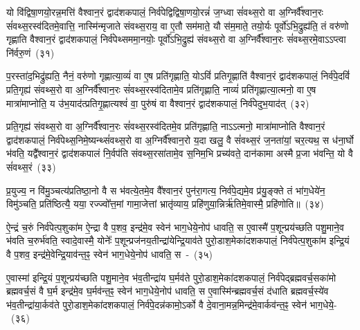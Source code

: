 यो वि॑द्विषा॒णयो॒रन्न॒मत्ति॑ वैश्वान॒रं द्वाद॑श\-कपालं॒ निर्व॑पेद्विद्विषा॒\-णयो॒रन्नं॑ ज॒ग्ध्वा सं॑वथ्स॒रो वा अ॒ग्निर्वै᳚श्वान॒रः सं॑वथ्स॒रस्व॑दितमे॒वात्ति॒ नास्मि॑न्मृजाते संवथ्स॒राय॒ वा ए॒तौ सम॑माते॒ यौ स॑म॒माते॒ तयो॒र्यः पूर्वो॑\-ऽभि॒द्रुह्य॑ति॒ तं वरु॑णो गृह्णाति वैश्वान॒रं द्वाद॑श\-कपालं॒ निर्व॑पेथ्सममा॒नयोः॒ पूर्वो॑\-ऽभि॒द्रुह्य॑ संवथ्स॒रो वा अ॒ग्निर्वै᳚श्वान॒रः सं॑वथ्स॒रमे॒वा\-ऽऽ\-प्त्वा नि॑र्वरु॒णं~(३१)

प॒रस्ता॑द॒भिद्रु॑ह्यति॒ नैनं॒ वरु॑णो गृह्णात्या॒व्यं॑ वा ए॒ष प्रति॑गृह्णाति॒ यो\-ऽविं॑ प्रतिगृ॒ह्णाति॑ वैश्वान॒रं द्वाद॑श\-कपालं॒ निर्व॑पे॒दविं॑ प्रति॒गृह्य॑ संवथ्स॒रो वा अ॒ग्निर्वै᳚श्वान॒रः सं॑वथ्स॒रस्व॑दितामे॒व प्रति॑गृह्णाति॒ नाव्यं॑ प्रति॑\-गृह्णात्या॒त्मनो॒ वा ए॒ष मात्रा॑माप्नोति॒ य उ॑भ॒याद॑त्प्रतिगृ॒ह्णात्यश्वं॑ वा॒ पुरु॑षं वा वैश्वान॒रं द्वाद॑श\-कपालं॒ निर्व॑पेदुभ॒याद॑त्~(३२)

प्रति॒गृह्य॑ संवथ्स॒रो वा अ॒ग्निर्वै᳚श्वान॒रः सं॑वथ्स॒रस्व॑दितमे॒व प्रति॑गृह्णाति॒ ना\-ऽऽ\-त्मनो॒ मात्रा॑माप्नोति वैश्वान॒रं द्वाद॑श\-कपालं॒ निर्व॑पेथ्स॒निमे॒ष्यन्थ्सं॑वथ्स॒रो वा अ॒ग्निर्वै᳚श्वान॒रो य॒दा खलु॒ वै सं॑वथ्स॒रं ज॒नता॑यां॒ चर॒त्यथ॒ स ध॑ना॒र्घो भ॑वति॒ यद्वै᳚श्वान॒रं द्वाद॑श\-कपालं नि॒र्वप॑ति संवथ्स॒रसा॑तामे॒व स॒निम॒भि प्रच्य॑वते॒ दान॑कामा अस्मै प्र॒जा भ॑वन्ति॒ यो वै सं॑वथ्स॒रं~(३३)

प्र॒युज्य॒ न वि॑मु॒ञ्चत्य॑प्रतिष्ठा॒नो वै स भ॑वत्ये॒तमे॒व वै᳚श्वान॒रं पुन॑रा॒गत्य॒ निर्व॑पे॒द्यमे॒व प्र॑यु॒ङ्क्ते तं भा॑ग॒धेये॑न॒ विमु॑ञ्चति॒ प्रति॑ष्ठित्यै॒ यया॒ रज्ज्वो᳚त्त॒मां गामा॒जेत्तां भ्रातृ॑व्याय॒ प्रहि॑णुया॒न्निर्\mbox{}ऋ॑तिमे॒वास्मै॒ प्रहि॑णोति॥~(३४)

{\anuvakamend[{नि॒र्व॒रु॒णं व॑पेदुभ॒याद॒द्यो वै सं॑वथ्स॒रꣳ षट्त्रिꣳ॑शच्च।}]}

ऐ॒न्द्रं च॒रुं निर्व॑पेत्प॒शुका॑म ऐ॒न्द्रा वै प॒शव॒ इन्द्र॑मे॒व स्वेन॑ भाग॒धेये॒नोप॑ धावति॒ स ए॒वास्मै॑ प॒शून्प्रय॑च्छति पशु॒माने॒व भ॑वति च॒रुर्भ॑वति॒ स्वादे॒वास्मै॒ योनेः᳚ प॒शून्प्रज॑नय॒तीन्द्रा॑येन्द्रि॒याव॑ते पुरो॒डाश॒मेका॑\-दश\-कपालं॒ निर्व॑पेत्प॒शुका॑म इन्द्रि॒यं वै प॒शव॒ इन्द्र॑मे॒वेन्द्रि॒याव॑न्त॒ꣴ॒ स्वेन॑ भाग॒धेये॒नोप॑ धावति॒ स~-~(३५)

ए॒वास्मा॑ इन्द्रि॒यं प॒शून्प्रय॑च्छति पशु॒माने॒व भ॑व॒तीन्द्रा॑य घ॒र्मव॑ते पुरो॒डाश॒मेका॑\-दश\-कपालं॒ निर्व॑पेद्ब्रह्मवर्च॒सका॑मो ब्रह्मवर्च॒सं वै घ॒र्म इन्द्र॑मे॒व घ॒र्मव॑न्त॒ꣴ॒ स्वेन॑ भाग॒धेये॒नोप॑ धावति॒ स ए॒वास्मि॑न्ब्रह्मवर्च॒सं द॑धाति ब्रह्मवर्च॒स्ये॑व भ॑व॒तीन्द्रा॑या॒र्कव॑ते पुरो॒डाश॒मेका॑\-दश\-कपालं॒ निर्व॑पे॒दन्न॑कामो॒\-ऽर्को वै दे॒वाना॒मन्न॒मिन्द्र॑मे॒वार्कव॑न्त॒ꣴ॒ स्वेन॑ भाग॒धेये॒-~(३६)

